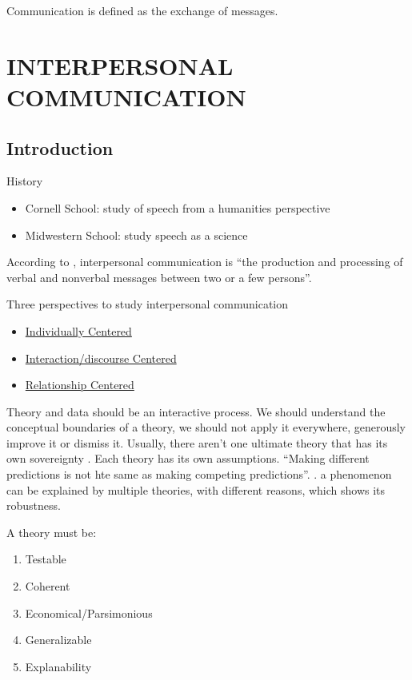 \documentclass[
]{book}
\providecommand{\tightlist}{%
  \setlength{\itemsep}{0pt}\setlength{\parskip}{0pt}}
\begin{document}
Communication is defined as the exchange of messages.

\hypertarget{part-interpersonal-communication}{%
\part{INTERPERSONAL COMMUNICATION}\label{part-interpersonal-communication}}

\hypertarget{intro}{%
\chapter{Introduction}\label{intro}}

History

\begin{itemize}
\tightlist
\item
  Cornell School: study of speech from a humanities perspective
\item
  Midwestern School: study speech as a science
\end{itemize}

According to \citep{Baxter_2008}, interpersonal communication is ``the production and processing of verbal and nonverbal messages between two or a few persons''.

Three perspectives to study interpersonal communication \citep{Baxter_2008}

\begin{itemize}
\tightlist
\item
  \protect\hyperlink{individually-centered}{Individually Centered}
\item
  \protect\hyperlink{interactiondiscourse-centered}{Interaction/discourse Centered}
\item
  \protect\hyperlink{relationship-centered}{Relationship Centered}
\end{itemize}

Theory and data should be an interactive process. We should understand the conceptual boundaries of a theory, we should not apply it everywhere, generously improve it or dismiss it. Usually, there aren't one ultimate theory that has its own sovereignty \citep{Higgins_2004}. Each theory has its own assumptions. ``Making different predictions is not hte same as making competing predictions''. \citep{Higgins_2004}. a phenomenon can be explained by multiple theories, with different reasons, which shows its robustness.

A theory must be:

\begin{enumerate}
\def\labelenumi{\arabic{enumi}.}
\tightlist
\item
  Testable
\item
  Coherent
\item
  Economical/Parsimonious
\item
  Generalizable
\item
  Explanability
\end{enumerate}
\end{document}
